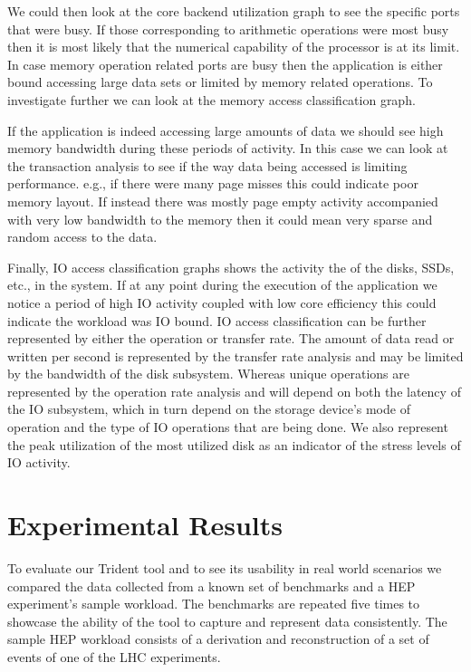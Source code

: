 \documentclass{webofc}
\begin{document}
We could then look at the core backend utilization graph to see the specific ports that were busy. If those corresponding to arithmetic operations were most busy then it is most likely that the numerical capability of the processor is at its limit. In case memory operation related ports are busy then the application is either bound accessing large data sets or limited by memory related operations. To investigate further we can look at the memory access classification graph.

If the application is indeed accessing large amounts of data we should see high memory bandwidth during these periods of activity. In this case we can look at the transaction analysis to see if the way data being accessed is limiting performance. e.g., if there were many page misses this could indicate poor memory layout. If instead there was mostly page empty activity accompanied with very low bandwidth to the memory then it could mean very sparse and random access to the data. 

Finally, IO access classification graphs shows the activity the of the disks, SSDs, etc., in the system. If at any point during the execution of the application we notice a period of high IO activity coupled with low core efficiency this could indicate the workload was IO bound. IO access classification can be further represented by either the operation or transfer rate. The amount of data read or written per second is represented by the transfer rate analysis and may be limited by the bandwidth of the disk subsystem. Whereas unique operations are represented by the operation rate analysis and will depend on both the latency of the IO subsystem, which in turn depend on the storage device's mode of operation and the type of IO operations that are being done. We also represent the peak utilization of the most utilized disk as an indicator of the stress levels of IO activity.

\section{Experimental Results}
\label{sec:results}

To evaluate our Trident tool and to see its usability in real world scenarios we compared the data collected from a known set of benchmarks and a HEP experiment's sample workload. The benchmarks are repeated five times to showcase the ability of the tool to capture and represent data consistently. The sample HEP workload consists of a derivation and reconstruction of a set of events of one of the LHC experiments.
\end{document}
